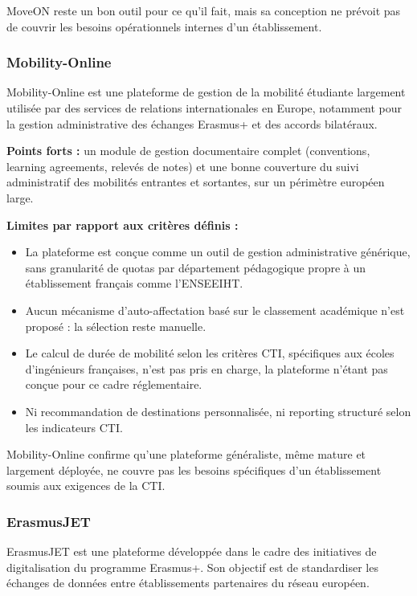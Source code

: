 MoveON reste un bon outil pour ce qu'il fait, mais sa conception ne prévoit pas de
couvrir les besoins opérationnels internes d'un établissement.

\subsubsection{Mobility-Online}

Mobility-Online est une plateforme de gestion de la mobilité étudiante largement utilisée par des services de relations internationales en Europe, notamment pour la gestion administrative des échanges Erasmus+ et des accords bilatéraux.

\textbf{Points forts :} un module de gestion documentaire complet (conventions, learning agreements, relevés de notes) et une bonne couverture du suivi administratif des mobilités entrantes et sortantes, sur un périmètre européen large.

\textbf{Limites par rapport aux critères définis :}

\begin{itemize}
    \item La plateforme est conçue comme un outil de gestion administrative générique, sans granularité de quotas par département pédagogique propre à un établissement français comme l'ENSEEIHT.
    \item Aucun mécanisme d'auto-affectation basé sur le classement académique n'est proposé : la sélection reste manuelle.
    \item Le calcul de durée de mobilité selon les critères CTI, spécifiques aux écoles d'ingénieurs françaises, n'est pas pris en charge, la plateforme n'étant pas conçue pour ce cadre réglementaire.
    \item Ni recommandation de destinations personnalisée, ni reporting structuré selon les indicateurs CTI.
\end{itemize}

Mobility-Online confirme qu'une plateforme généraliste, même mature et largement déployée, ne couvre pas les besoins spécifiques d'un établissement soumis aux exigences de la CTI.

\subsubsection{ErasmusJET}

ErasmusJET est une plateforme développée dans le cadre des initiatives de digitalisation du programme Erasmus+. Son objectif est de standardiser les échanges de données entre établissements partenaires du réseau européen.

